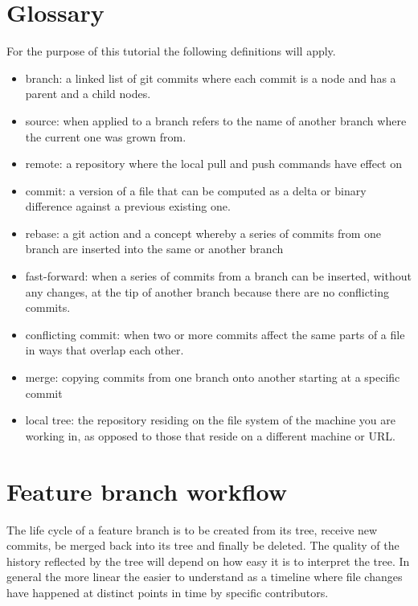 \documentclass[10pt]{article}
\begin{document}
\section{Glossary}

For the purpose of this tutorial the following definitions will apply.

\begin{itemize}
    \item branch: a linked list of git commits where each commit is a node and has a parent and a child nodes.
    \item source: when applied to a branch refers to the name of another branch where the current one was grown from.
    \item remote: a repository where the local pull and push commands have effect on
    \item commit: a version of a file that can be computed as a delta or binary difference against a previous existing one.
    \item rebase: a git action and a concept whereby a series of commits from one branch are inserted into the same or another branch
    \item fast-forward: when a series of commits from a branch can be inserted, without any changes, at the tip of another branch because there are no conflicting commits.
    \item conflicting commit: when two or more commits affect the same parts of a file in ways that overlap each other.  
    \item merge: copying commits from one branch onto another starting at a specific commit
    \item local tree: the repository residing on the file system of the machine you are working in, as opposed to those that reside on a different machine or URL.
\end{itemize}

\section{Feature branch workflow}

The life cycle of a feature branch is to be created from its tree, receive new commits, be merged back into its tree and finally be deleted.
The quality of the history reflected by the tree will depend on how easy it is to interpret the tree.
In general the more linear the easier to understand as a timeline where file changes have happened at distinct points in time by specific contributors.
\end{document}
